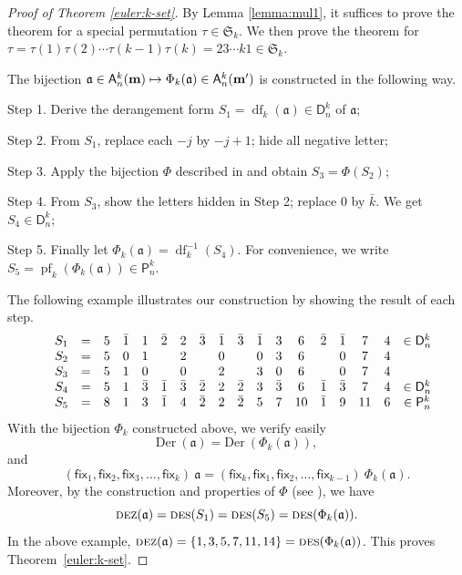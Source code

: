 \documentclass[12pt]{amsart}
\numberwithin{equation}{section}
\theoremstyle{plain}
\theoremstyle{definition}
\newcommand\A{\mathsf{A}}
\renewcommand\P{\mathsf{P}}
\newcommand\D{\mathsf{D}}
\def\Der{\mathrm{Der}}
\def\DES{\hbox{\rm\textsc{des}}}
\def\DEZ{\hbox{\rm\textsc{dez}}}
\def\fix{\mathsf{fix}}
\def\S{\mathfrak{S}}
\def\a{\mathfrak{a}}
\def\df{\operatorname{df}}
\def\pf{\operatorname{pf}}
\def\neg#1{{{{\bar#1}}}}
\begin{document}
\begin{proof}[Proof of Theorem \ref{euler:k-set}]
By Lemma \ref{lemma:mul1}, it suffices to prove the theorem for a special permutation $\tau\in\S_k$.
We then prove the theorem for $\tau=\tau(1)\tau(2)\cdots\tau(k-1)\tau(k)=2 3 \cdots k 1\in \S_k$.

The bijection $\a \in \A_n^k({\bf m}) \mapsto \Phi_k(\a) \in \A_n^k({\bf m'})$ is constructed  in the following way.

Step 1. Derive the derangement form $S_1 = \df_k(\a)\in \D_n^k$ of $\a$;

Step 2. From $S_1$, replace each $-j$ by $-j+1$;  hide all negative letter; 

Step 3. Apply the bijection $\Phi$ described in \cite[Section 2]{fh1} and obtain $S_3=\Phi(S_2)$;

Step 4. From $S_3$, show the letters hidden in Step 2; replace $0$ by $\neg k$.
We get $S_4 \in \D_n^k$;

Step 5. Finally let $\Phi_k(\a)=\df_k^{-1}(S_4)$. For convenience, we write $S_5=\pf_k(\Phi_k(\a))\in \P_n^k$.


\noindent
The following example illustrates our construction by showing the result of each step.
\medskip
$$
\begin{array}{c c c  c c c c c c c c c c c c c c c c c c c c c}
	
	&S_1 &=&5&\bar 1&1&\bar 2&2 &\bar3    &\bar 1&\bar 3&\bar 1&3&6&\bar 2&\bar 1&7&4 & \in \D_n^k\\
	&S_2 &=&5&0&1&&2   & &0&&0&3&6&&0&7&4 &\\
	&S_3 &=&5&1&0&&0   & &2&&3&0&6&&0&7&4 & \\
	&S_4 &=&5&1&\bar 3&\bar 1&\bar 3   & \bar2&2&\bar 2&3&\bar 3&6&\bar 1&\bar 3&7&4 & \in \D_n^k\\
	&	S_5 &=&8&1& 3&\bar 1 &4   & \bar 2 &2&\bar2 &5&7&10&\bar1&9&11&6 & \in \P_n^k\\
	
\end{array}
$$
With the bijection $\Phi_k$ constructed above, we verify easily 
\begin{equation*}
	\Der~(\a) = \Der~(\Phi_k(\a)),
\end{equation*}
and
	\begin{equation}\label{eq:mulchange}
	(\fix_1, \fix_2, \fix_3, \ldots, \fix_k)~\a 
	= (\fix_k,\fix_1,\fix_2, \ldots, \fix_{k-1} )~\Phi_k(\a).
\end{equation}
Moreover, by the construction and properties of $\Phi$ (see \cite[Thm.~1.1]{fh1}), we have
\begin{equation*}
	\DEZ(\a) = \DES(S_1)=  \DES(S_5)= \DES(\Phi_k(\a)).
\end{equation*}
In the above example, 
$	\DEZ(\a) = \{1,3,5,7,11,14\}= \DES(\Phi_k(\a))$.
This proves Theorem~\ref{euler:k-set}.
\end{proof}
\end{document}
